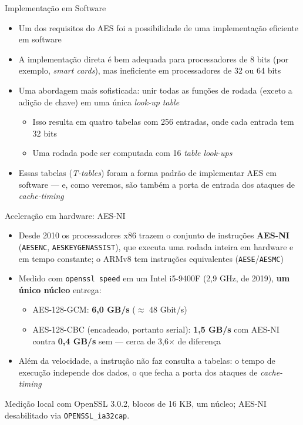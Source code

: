 \documentclass{beamer}
\begin{document}
\begin{frame}{Implementação em Software}

\begin{itemize}
    \item Um dos requisitos do AES foi a possibilidade de uma implementação eficiente em software

    \item A implementação direta é bem adequada para processadores de 8 bits (por exemplo, \textit{smart cards}), mas ineficiente em processadores de 32 ou 64 bits

    \item Uma abordagem mais sofisticada: unir todas as funções de rodada (exceto a adição de chave) em uma única \textit{look-up table}
    \begin{itemize}
        \item Isso resulta em quatro tabelas com 256 entradas, onde cada entrada tem 32 bits
        \item Uma rodada pode ser computada com 16 \textit{table look-ups}
    \end{itemize}

    \item Essas tabelas (\textit{T-tables}) foram a forma padrão de implementar AES em software --- e, como veremos, são também a porta de entrada dos ataques de \textit{cache-timing}
\end{itemize}
\end{frame}


\begin{frame}{Aceleração em hardware: AES-NI}

\begin{itemize}
    \item Desde 2010 os processadores x86 trazem o conjunto de instruções \textbf{AES-NI} (\texttt{AESENC}, \texttt{AESKEYGENASSIST}), que executa uma rodada inteira em hardware e em tempo constante; o ARMv8 tem instruções equivalentes (\texttt{AESE}/\texttt{AESMC})

    \item Medido com \texttt{openssl speed} em um Intel i5-9400F (2,9 GHz, de 2019), \textbf{um único núcleo} entrega:
    \begin{itemize}
        \item AES-128-GCM: \textbf{6,0 GB/s} ($\approx$ 48 Gbit/s)
        \item AES-128-CBC (encadeado, portanto serial): \textbf{1,5 GB/s} com AES-NI contra \textbf{0,4 GB/s} sem --- cerca de 3,6$\times$ de diferença
    \end{itemize}

    \item Além da velocidade, a instrução não faz consulta a tabelas: o tempo de execução independe dos dados, o que fecha a porta dos ataques de \textit{cache-timing}
\end{itemize}
{\tiny Medição local com OpenSSL 3.0.2, blocos de 16 KB, um núcleo; AES-NI desabilitado via \texttt{OPENSSL\_ia32cap}.\par}
\end{frame}
\end{document}
